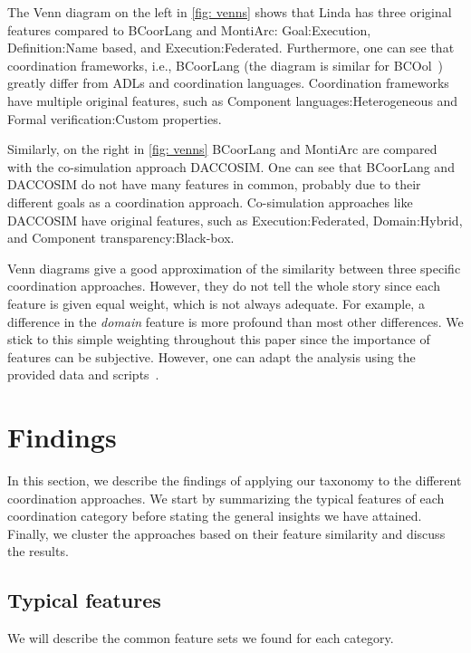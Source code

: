 \documentclass[runningheads]{llncs}
\begin{document}
The Venn diagram on the left in \autoref{fig: venns} shows that Linda has three original features compared to BCoorLang and MontiArc:
\textsf{Goal:Execution}, \textsf{Definition:Name based}, and \textsf{Execution:Federated}.
Furthermore, one can see that coordination frameworks, i.e., BCoorLang (the diagram is similar for BCOol~\cite{varalarsenBehavioralCoordinationOperator2015,varalarsenBCOolBehavioralCoordination2016}) greatly differ from ADLs and coordination languages.
Coordination frameworks have multiple original features, such as \textsf{Component languages:Heterogeneous} and \textsf{Formal verification:Custom properties}.

Similarly, on the right in \autoref{fig: venns} BCoorLang and MontiArc are compared with the co-simulation approach DACCOSIM.
One can see that BCoorLang and DACCOSIM do not have many features in common, probably due to their different goals as a coordination approach.
Co-simulation approaches like DACCOSIM have original features, such as \textsf{Execution:Federated}, \textsf{Domain:Hybrid}, and \textsf{Component transparency:Black-box}.

Venn diagrams give a good approximation of the similarity between three specific coordination approaches.
However, they do not tell the whole story since each feature is given equal weight, which is not always adequate.
For example, a difference in the \textit{domain} feature is more profound than most other differences.
We stick to this simple weighting throughout this paper since the importance of features can be subjective.
However, one can adapt the analysis using the provided data and scripts~\cite{timkrauterArtifactsCoordination2024}.

\section{Findings} \label{sec: findings}

In this section, we describe the findings of applying our taxonomy to the different coordination approaches.
We start by summarizing the typical features of each coordination category before stating the general insights we have attained.
Finally, we cluster the approaches based on their feature similarity and discuss the results.

\subsection{Typical features}
We will describe the common feature sets we found for each category.
\end{document}
